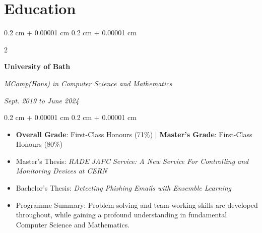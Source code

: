 \documentclass[10pt, letterpaper]{article}
\newenvironment{highlights}{
    \begin{itemize}[
        topsep=0.10 cm,
        parsep=0.10 cm,
        partopsep=0pt,
        itemsep=0pt,
        leftmargin=0.4 cm + 10pt
    ]
}{
    \end{itemize}
} %
\newenvironment{onecolentry}{
    \begin{adjustwidth}{
        0.2 cm + 0.00001 cm
    }{
        0.2 cm + 0.00001 cm
    }
}{
    \end{adjustwidth}
} %
\newenvironment{twocolentry}[2][]{
    \onecolentry
    \def\secondColumn{#2}
    \setcolumnwidth{\fill, 4.5 cm}
    \begin{paracol}{2}
}{
    \switchcolumn \raggedleft \secondColumn
    \end{paracol}
    \endonecolentry
} %
\begin{document}
    
    \section{Education}



        
        \begin{twocolentry}{
            
            
        \textit{Sept. 2019 to June 2024}}
            \textbf{University of Bath}

            \textit{MComp(Hons) in Computer Science and Mathematics}
        \end{twocolentry}

        \vspace{0.10 cm-3px}
        \begin{onecolentry}
            \begin{highlights}
                \item \textbf{Overall Grade}: First-Class Honours (71\%) | \textbf{Master's Grade}: First-Class Honours (80\%)
                \item Master's Thesis: \textit{RADE JAPC Service: A New Service For Controlling and Monitoring Devices at CERN}
                \item Bachelor's Thesis: \textit{Detecting Phishing Emails with Ensemble Learning}
                \item Programme Summary: Problem solving and team-working skills are developed throughout, while gaining a profound understanding in fundamental Computer Science and Mathematics. 
            \end{highlights}
        \end{onecolentry}



            
            


\end{document}
